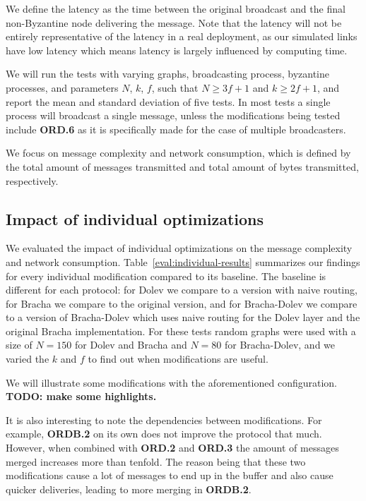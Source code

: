 We define the latency as the time between the original broadcast and the final non-Byzantine node delivering the message. Note that the latency will not be entirely representative of the latency in a real deployment, as our simulated links have low latency which means latency is largely influenced by computing time. 

We will run the tests with varying graphs, broadcasting process, byzantine processes, and parameters $N$, $k$, $f$, such that $N \ge 3f+1$ and $k \ge 2f+1$, and report the mean and standard deviation of five tests. In most tests a single process will broadcast a single message, unless the modifications being tested include \textbf{ORD.6} as it is specifically made for the case of multiple broadcasters.

We focus on message complexity and network consumption, which is defined by the total amount of messages transmitted and total amount of bytes transmitted, respectively.

\subsection{Impact of individual optimizations}
We evaluated the impact of individual optimizations on the message complexity and network consumption. Table~\ref{eval:individual-results} summarizes our findings for every individual modification compared to its baseline. The baseline is different for each protocol: for Dolev we compare to a version with naive routing, for Bracha we compare to the original version, and for Bracha-Dolev we compare to a version of Bracha-Dolev which uses naive routing for the Dolev layer and the original Bracha implementation. For these tests random graphs were used with a size of $N=150$ for Dolev and Bracha and $N=80$ for Bracha-Dolev, and we varied the $k$ and $f$ to find out when modifications are useful. 

We will illustrate some modifications with the aforementioned configuration. \textbf{TODO: make some highlights.}

It is also interesting to note the dependencies between modifications. For example, \textbf{ORDB.2} on its own does not improve the protocol that much. However, when combined with \textbf{ORD.2} and \textbf{ORD.3} the amount of messages merged increases more than tenfold. The reason being that these two modifications cause a lot of messages to end up in the buffer and also cause quicker deliveries, leading to more merging in \textbf{ORDB.2}.

